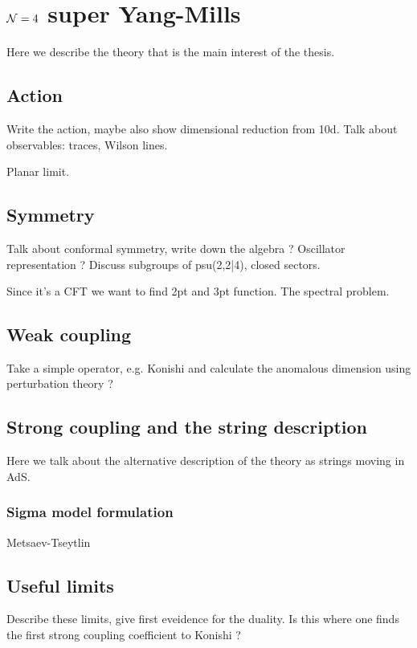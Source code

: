 
\section{$\mathcal{N}=4$ super Yang-Mills}

Here we describe the theory that is the main interest of the thesis.

\subsection{Action}

Write the action, maybe also show dimensional reduction from 10d. Talk about observables: traces, Wilson lines. 

Planar limit.

\subsection{Symmetry}

Talk about conformal symmetry, write down the algebra ? Oscillator representation ? Discuss subgroups of psu(2,2|4), closed sectors. 

Since it's a CFT we want to find 2pt and 3pt function. The spectral problem.

\subsection{Weak coupling}

Take a simple operator, e.g. Konishi and calculate the anomalous dimension using perturbation theory ?

\subsection{Strong coupling and the string description}

Here we talk about the alternative description of the theory as strings moving in AdS.

\subsubsection{Sigma model formulation}

Metsaev-Tseytlin

\subsection{Useful limits}

Describe these limits, give first eveidence for the duality. Is this where one finds the first strong coupling coefficient to Konishi ?